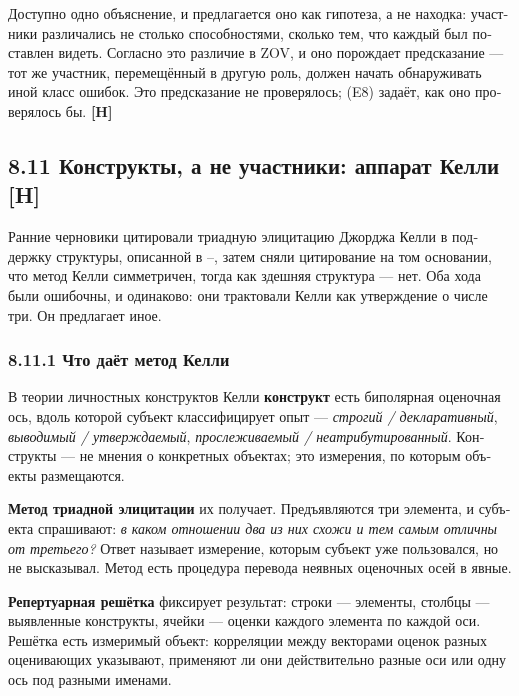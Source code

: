 \begin{russian}
Доступно одно объяснение, и предлагается оно как гипотеза, а не находка: участники различались не столько способностями, сколько тем, что каждый был поставлен видеть. Согласно  это различие в ZOV, и оно порождает предсказание — тот же участник, перемещённый в другую роль, должен начать обнаруживать иной класс ошибок. Это предсказание не проверялось;  (E8) задаёт, как оно проверялось бы. \textbf{[H]}


\subsection*{8.11 Конструкты, а не участники: аппарат Келли \textbf{[H]}}
\label{sec:ru:8.11}

Ранние черновики цитировали триадную элицитацию Джорджа Келли в поддержку структуры, описанной в –, затем сняли цитирование на том основании, что метод Келли симметричен, тогда как здешняя структура — нет. Оба хода были ошибочны, и одинаково: они трактовали Келли как утверждение о числе три. Он предлагает иное.


\subsubsection*{8.11.1 Что даёт метод Келли}
\label{sec:ru:8.11.1}

В теории личностных конструктов Келли \textbf{конструкт} есть биполярная оценочная ось, вдоль которой субъект классифицирует опыт — \emph{строгий / декларативный}, \emph{выводимый / утверждаемый}, \emph{прослеживаемый / неатрибутированный}. Конструкты — не мнения о конкретных объектах; это измерения, по которым объекты размещаются.

\textbf{Метод триадной элицитации} их получает. Предъявляются три элемента, и субъекта спрашивают: \emph{в каком отношении два из них схожи и тем самым отличны от третьего?} Ответ называет измерение, которым субъект уже пользовался, но не высказывал. Метод есть процедура перевода неявных оценочных осей в явные.

\textbf{Репертуарная решётка} фиксирует результат: строки — элементы, столбцы — выявленные конструкты, ячейки — оценки каждого элемента по каждой оси. Решётка есть измеримый объект: корреляции между векторами оценок разных оценивающих указывают, применяют ли они действительно разные оси или одну ось под разными именами.



\end{russian}
